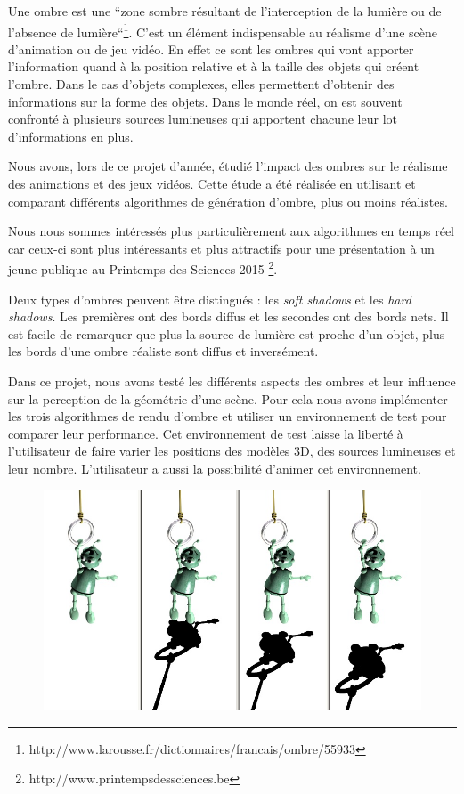 \documentclass[a4paper,12pt]{report}
\begin{document}
Une ombre est une ``zone sombre résultant de l'interception de la lumière ou de l'absence de lumière``\footnote{http://www.larousse.fr/dictionnaires/francais/ombre/55933}. C'est un élément indispensable au réalisme d'une scène d'animation ou de jeu vidéo. En effet ce sont les ombres qui vont apporter l'information quand à la position relative et à la taille des objets qui créent l'ombre. Dans le cas d'objets complexes, elles permettent d'obtenir des informations sur la forme des objets.
Dans le monde réel, on est souvent confronté à plusieurs sources lumineuses qui apportent chacune leur lot d'informations en plus.


Nous avons, lors de ce projet d'année, étudié l'impact des ombres sur le réalisme des animations et des jeux vidéos. Cette étude a été réalisée en utilisant et comparant différents algorithmes de génération d'ombre, plus ou moins réalistes.


Nous nous sommes intéressés plus particulièrement aux algorithmes en temps réel car ceux-ci sont plus intéressants et plus attractifs pour une présentation à un jeune publique au Printemps des Sciences 2015 \footnote{http://www.printempsdessciences.be}.

Deux types d'ombres peuvent être distingués : les \textit{soft shadows} et les \textit{hard shadows}. Les premières ont des bords diffus et les secondes ont des bords nets. Il est facile de remarquer que plus la source de lumière est proche d'un objet, plus les bords d'une ombre réaliste sont diffus et inversément.

Dans ce projet, nous avons testé les différents aspects des ombres et leur influence sur la perception de la géométrie d'une scène. Pour cela nous avons implémenter les trois algorithmes de rendu d'ombre et utiliser un environnement de test pour comparer leur performance. Cet environnement de test laisse la liberté à l'utilisateur de faire varier les positions des modèles 3D, des sources lumineuses et leur nombre. L'utilisateur a aussi la possibilité d'animer cet environnement.

\begin{figure}[H]
\includegraphics[scale=0.25]{images/relativePosition.jpg}
\centering
{}
\end{figure}
\end{document}
